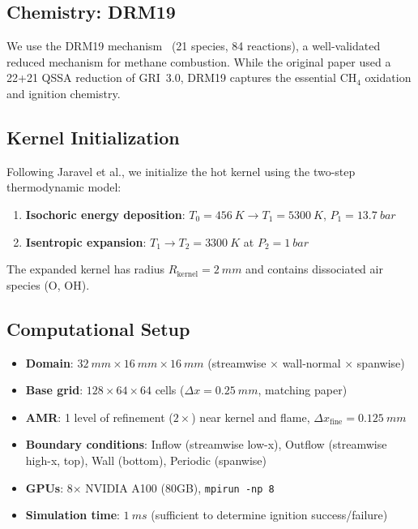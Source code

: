 \documentclass[11pt]{article}
\begin{document}
\subsection{Chemistry: DRM19}
We use the DRM19 mechanism~\cite{drm19} (21 species, 84 reactions), a well-validated reduced mechanism for methane combustion. While the original paper used a 22+21 QSSA reduction of GRI~3.0, DRM19 captures the essential CH$_4$ oxidation and ignition chemistry.

\subsection{Kernel Initialization}
Following Jaravel et al., we initialize the hot kernel using the two-step thermodynamic model:
\begin{enumerate}
    \item \textbf{Isochoric energy deposition}: $T_0 = \SI{456}{K} \to T_1 = \SI{5300}{K}$, $P_1 = \SI{13.7}{bar}$
    \item \textbf{Isentropic expansion}: $T_1 \to T_2 = \SI{3300}{K}$ at $P_2 = \SI{1}{bar}$
\end{enumerate}
The expanded kernel has radius $R_\mathrm{kernel} = \SI{2}{mm}$ and contains dissociated air species (O, OH).

\subsection{Computational Setup}
\begin{itemize}[leftmargin=*]
    \item \textbf{Domain}: $\SI{32}{mm} \times \SI{16}{mm} \times \SI{16}{mm}$ (streamwise $\times$ wall-normal $\times$ spanwise)
    \item \textbf{Base grid}: $128 \times 64 \times 64$ cells ($\Delta x = \SI{0.25}{mm}$, matching paper)
    \item \textbf{AMR}: 1 level of refinement ($2\times$) near kernel and flame, $\Delta x_\mathrm{fine} = \SI{0.125}{mm}$
    \item \textbf{Boundary conditions}: Inflow (streamwise low-x), Outflow (streamwise high-x, top), Wall (bottom), Periodic (spanwise)
    \item \textbf{GPUs}: 8$\times$ NVIDIA A100 (80GB), \texttt{mpirun -np 8}
    \item \textbf{Simulation time}: $\SI{1}{ms}$ (sufficient to determine ignition success/failure)
\end{itemize}
\end{document}
